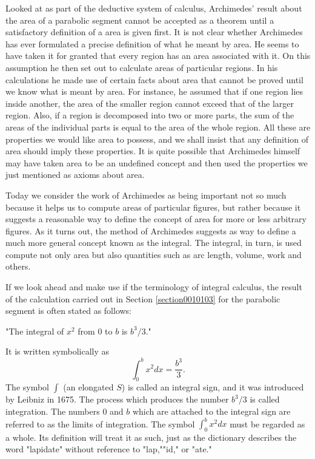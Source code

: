 \documentclass[cn,11pt,chinese]{elegantbook}
\numberwithin{equation}{section}
\begin{document}
Looked at as part of the deductive system of calculus, Archimedes' result about the area of a parabolic segment cannot be accepted as a theorem until a satisfactory definition of a area is given first. It is not clear whether Archimedes has ever formulated a precise definition of what he meant by area. He seems to have taken it for granted that every region has an area associated with it. On this assumption he then set out to calculate areas of particular regions. In his calculations he made use of certain facts about area that cannot be proved until we know what is meant by area. For instance, he assumed that if one region lies inside another, the area of the smaller region cannot exceed that of the larger region. Also, if a region is decomposed into two or more parts, the sum of the areas of the individual parts is equal to the area of the whole region. All these are properties we would like area to possess, and we shall insist that any definition of area should imply these properties. It is quite possible that Archimedes himself may have taken area to be an undefined concept and then used the properties we just mentioned as axioms about area.

Today we consider the work of Archimedes as being important not so much because it helps us to compute areas of particular figures, but rather because it suggests a reasonable way to define the concept of area for more or less arbitrary figures. As it turns out, the method of Archimedes suggests as way to define a much more general concept known as the integral. The integral, in turn, is used compute not only area but also quantities such as arc length, volume, work and others.

If we look ahead and make use if the terminology of integral calculus, the result of the calculation carried out in Section {\ref{section0010103}} for the parabolic segment is often stated as follows: 
\centerline{"The integral of $x^2$ from $0$ to $b$ is $b^3/3$."}
It is written symbolically as 
\[
\int_{0}^{b}{x^2dx} = \frac{b^3}{3}.
\]
The symbol $\int$ (an elongated $S$) is called an integral sign, and it was introduced by Leibniz in 1675. The process which produces the number $b^3/3$ is called integration. The numbers $0$ and $b$ which are attached to the integral sign are referred to as the limits of integration. The symbol $\int_{0}^{b}{x^2dx}$ must be regarded as a whole. Its definition will treat it as such, just as the dictionary describes the word "lapidate" without reference to "lap,""id," or "ate."
\end{document}
